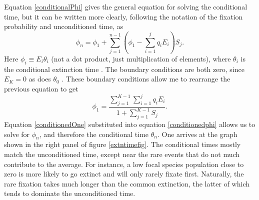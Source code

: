 Equation \ref{conditionalPhi} gives the general equation for solving the conditional time, but it can be written more clearly, following the notation of the fixation probability and unconditioned time, as
\begin{equation}
\phi_n = \phi_1 + \sum_{j=1}^{n-1}\left(\phi_1 - \sum_{i=1}^{j}q_iE_i\right)S_{j}.  %
 \label{conditionedphi}
\end{equation}
Here $\phi_i \equiv E_i \theta_i$ (not a dot product, just multiplication of elements), where $\theta_i$ is the conditional extinction time \cite{Iyer-Biswas2015}. %
The boundary conditions are both zero, since $E_K=0$ as does $\theta_0$ \cite{Nisbet1982}. 
These boundary conditions allow me to rearrange the previous equation to get
\begin{equation}
\phi_1 = \frac{\sum_{j=1}^{K-1}\sum_{i=1}^{j}q_iE_i}{1+\sum_{j=1}^{K-1}S_j}. 
 \label{conditionedOne}
\end{equation}
Equation \ref{conditionedOne} substituted into equation \ref{conditionedphi} allows us to solve for $\phi_n$, and therefore the conditional time $\theta_n$. 
One arrives at the graph shown in the right panel of figure \ref{extntimefig}. 
The conditional times mostly match the unconditioned time, except near the rare events that do not much contribute to the average. 
For instance, a low focal species population close to zero is more likely to go extinct and will only rarely fixate first. 
Naturally, the rare fixation takes much longer than the common extinction, the latter of which tends to dominate the unconditioned time. 




